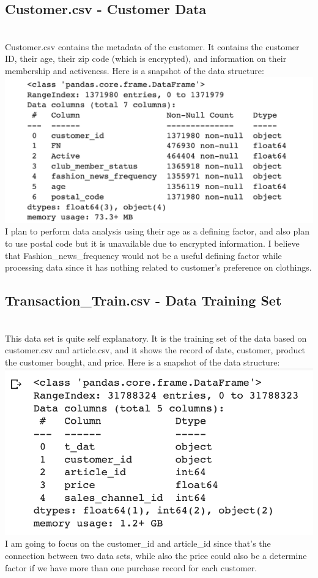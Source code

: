 \documentclass{article}
\begin{document}
\subsection{Customer.csv - Customer Data}
\\
Customer.csv contains the metadata of the customer. It contains the customer ID, their age, their zip code (which is encrypted), and information on their membership and activeness. Here is a snapshot of the data structure:
\\
\includegraphics[width=\textwidth]{CustomerDataRaw}
\\
I plan to perform data analysis using their age as a defining factor, and also plan to use postal code but it is unavailable due to encrypted information. I believe that Fashion\_news\_frequency would not be a useful defining factor while processing data since it has nothing related to customer's preference on clothings. 
\\
\subsection{Transaction\_Train.csv - Data Training Set}
\\
This data set is quite self explanatory. It is the training set of the data based on customer.csv and article.csv, and it shows the record of date, customer, product the customer bought, and price. Here is a snapshot of the data structure:
\\
\includegraphics[width=\textwidth]{TrainingDataRaw}
\\
I am going to focus on the customer\_id and article\_id since that's the connection between two data sets, while also the price could also be a determine factor if we have more than one purchase record for each customer.
\end{document}
